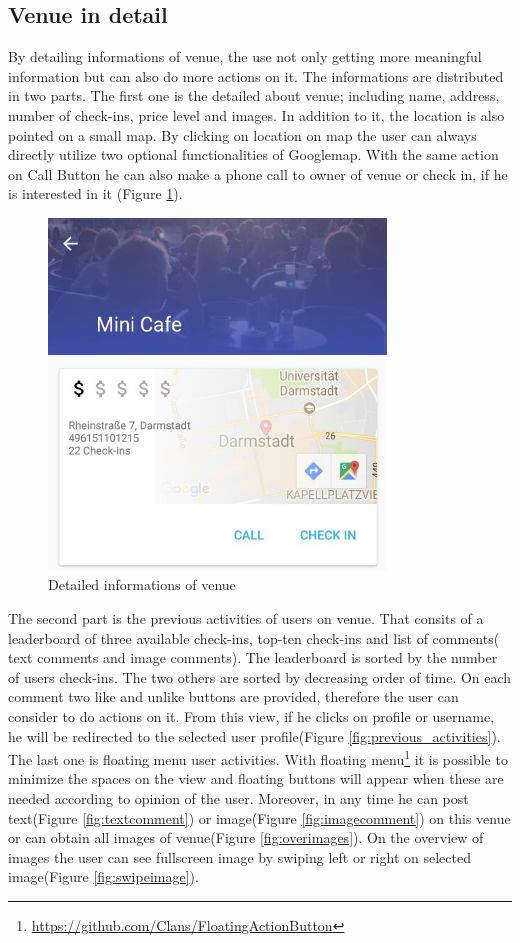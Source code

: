 \subsection{Venue in detail}
By detailing informations of venue, the use not only getting more meaningful information but can also do more actions on it. The informations are distributed in two parts. The first one is the detailed about venue; including name, address, number of check-ins, price level and images.
In addition to it, the location is also pointed on a small map. By clicking on location on map the user can always directly utilize two optional functionalities of Googlemap. With the same action on Call Button he can also make a phone call to owner of venue or check in, if he is interested in it (Figure \ref{fig:detailedInformationsOfVenue}).
\begin{figure}[htbp]
	\includegraphics[width=0.8\textwidth]{images/venueInDetail_Part_1.jpg}
	\centering
	\caption[]{Detailed informations of venue}
	\label{fig:detailedInformationsOfVenue}
\end{figure}

The second part is the previous activities of users on venue. That consits of a leaderboard of three available check-ins, top-ten check-ins and list of comments( text comments and image comments). The leaderboard is sorted by the number of users check-ins. The two others are sorted by decreasing order of time. On each comment two like and unlike buttons are provided, therefore the user can consider to do actions on it. From this view, if he clicks on profile or username, he will be redirected to the selected user profile(Figure \ref{fig:previous_activities}).
The last one is floating menu user activities. With floating menu\footnote{\url{https://github.com/Clans/FloatingActionButton}} it is possible to minimize the spaces on the view and floating buttons will appear when these are needed according to opinion of the user. Moreover, in any time he can post text(Figure \ref{fig:textcomment}) or image(Figure \ref{fig:imagecomment}) on this venue or can obtain all images of venue(Figure \ref{fig:overimages}). On the overview of images the user can see fullscreen image by swiping left or right on selected image(Figure \ref{fig:swipeimage}).

